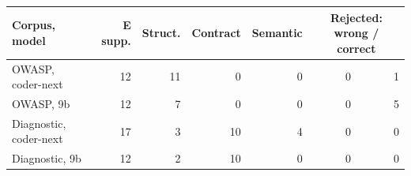 \begin{tabular}{lrrrrrr}
\toprule
Corpus, model & E supp. & Struct. & Contract & Semantic & \multicolumn{2}{c}{Rejected: wrong / correct} \\
\midrule
OWASP, coder-next & 12 & 11 & 0 & 0 & 0 & 1 \\
OWASP, 9b & 12 & 7 & 0 & 0 & 0 & 5 \\
Diagnostic, coder-next & 17 & 3 & 10 & 4 & 0 & 0 \\
Diagnostic, 9b & 12 & 2 & 10 & 0 & 0 & 0 \\
\bottomrule
\end{tabular}
